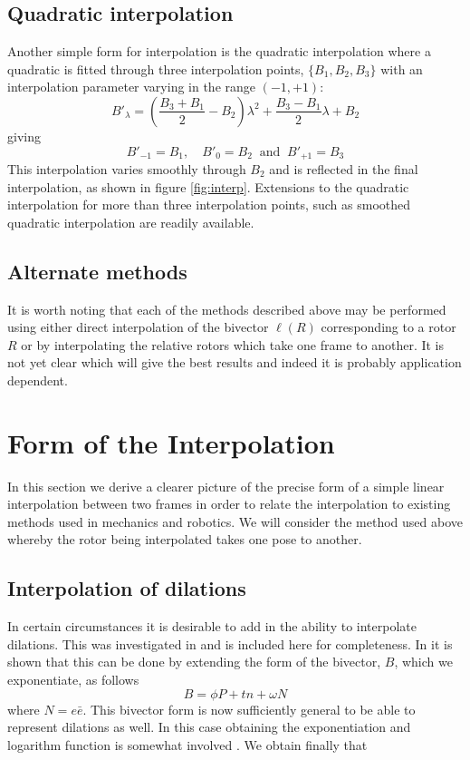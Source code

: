 \subsection{Quadratic interpolation}

Another simple form for interpolation is the quadratic interpolation where a quadratic 
is fitted through three interpolation points, $\{B_1, B_2, B_3\}$ with an interpolation
parameter varying in the range $(-1,+1)$:
\[
B'_\lambda = \left(\frac{B_3 + B_1}{2} - B_2\right)\lambda^2 + \frac{B_3 - B_1}{2}\lambda + B_2
\]
giving
\[
B'_{-1} = B_1,\quad B'_{0}=B_2\ \mbox{ and }\ B'_{+1} = B_3
\]
This interpolation varies smoothly through $B_2$ and is reflected in the final
interpolation, as shown in figure \ref{fig:interp}. Extensions to the quadratic
interpolation for more than three interpolation points, such as smoothed
quadratic interpolation \cite{cendes} are readily available.

\subsection{Alternate methods}

It is worth noting that each of the methods described above may be performed
using either direct interpolation of the bivector $\ell(R)$ corresponding
to a rotor $R$ or by interpolating the relative rotors which take one frame
to another. It is not yet clear which will give the best results and indeed
it is probably application dependent.

\section{Form of the Interpolation}

In this section we derive a clearer picture of the precise form of
a simple linear interpolation between two frames in order to relate the 
interpolation to existing methods used in mechanics and robotics. We will consider
the method used above whereby the rotor being interpolated takes one pose to another.

\subsection{Interpolation of dilations}

In certain circumstances it is desirable to add in the ability to interpolate
dilations. This was investigated in \cite{jic23fyr} and is included here
for completeness. In \cite{jic23fyr} it is shown that this can be done by extending
the form of the bivector, $B$, which we exponentiate, as follows
\[
B = \phi P + tn + \omega N
\]
where $N = e\bar{e}$. This bivector form is now sufficiently general
\cite{jic23fyr} to be able to represent dilations as well. In this case obtaining the
exponentiation
and logarithm function is somewhat involved \cite{jic23fyr}. We obtain
finally that

